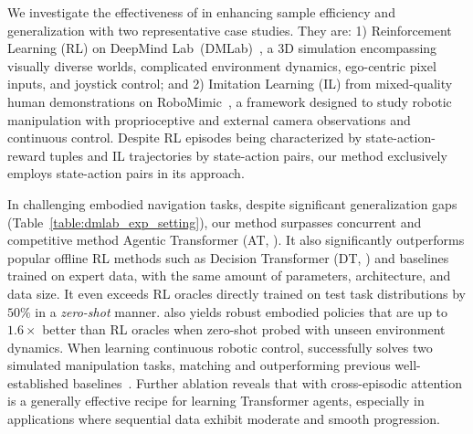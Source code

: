 


We investigate the effectiveness of \cec in enhancing sample efficiency and generalization with two representative case studies.
They are: 1) Reinforcement Learning (RL) on DeepMind Lab~(DMLab)~\citep{beattie2016deepmind}, a 3D simulation encompassing visually diverse worlds, complicated environment dynamics, ego-centric pixel inputs, and joystick control; and 2) Imitation Learning (IL) from mixed-quality human demonstrations on RoboMimic~\citep{mandlekar2021matters}, a framework designed to study robotic manipulation with proprioceptive and external camera observations and continuous control.
Despite RL episodes being characterized by state-action-reward tuples and IL trajectories by state-action pairs, our method exclusively employs state-action pairs in its approach.

In challenging embodied navigation tasks, despite significant generalization gaps (Table~\ref{table:dmlab_exp_setting}),
our method surpasses concurrent and competitive method Agentic Transformer (AT, \citet{liu2023emergent}).
It also significantly outperforms popular offline RL methods such as Decision Transformer (DT, \citet{chen2021decisiontransformer}) and baselines trained on expert data, with the same amount of parameters, architecture, and data size.
It even exceeds RL oracles directly trained on test task distributions 
by $50\%$ in a \emph{zero-shot} manner. 
\cec also yields robust embodied policies that are up to $1.6\times$ better than RL oracles when zero-shot probed with unseen environment dynamics.
When learning continuous robotic control, \cec successfully solves two simulated manipulation tasks, matching and outperforming previous well-established baselines~\cite {mandlekar2021matters,fujimoto2018offpolicy,kumar2020conservative}.
Further ablation reveals that \cec with cross-episodic attention is a generally effective recipe for learning Transformer agents, especially in applications where sequential data exhibit moderate and smooth progression.



























